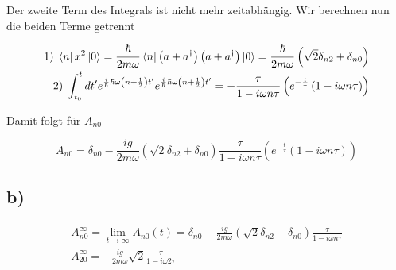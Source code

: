 Der zweite Term des Integrals ist nicht mehr zeitabh\"angig. Wir berechnen nun die beiden Terme getrennt

\begin{align}
1) \; \Bra{n} x^2 \Ket{0} = \frac{\hbar}{2m \omega} \Bra{n} \left(a + a^{\dagger} \right) \left(a + a^{\dagger} \right) \Ket{0} = \frac{\hbar}{2m \omega} \left( \sqrt{2} \delta_{n2} + \delta_{n0} \right) \\
2) \; \int_{t_0}^t dt' e^{\frac{i}{\hbar} \hbar \omega \left( n + \frac{1}{2} \right) t'} e^{\frac{i}{\hbar} \hbar \omega \left( n + \frac{1}{2} \right) t'} = -\frac{\tau}{1-i \omega n \tau} \left( e^{- \frac{t}{\tau}} \left(1-i\omega n \tau \right) \right)
\end{align}

Damit folgt f\"ur $A_{n0}$

\begin{equation}
A_{n0} = \delta_{n0} - \frac{ig}{2m \omega} \left( \sqrt{2} \delta_{n2} + \delta_{n0} \right) \frac{\tau}{1-i \omega n \tau} \left( e^{- \frac{t}{\tau}} \left(1-i\omega n \tau \right) \right)
\end{equation}

\subsection{b)}
 \begin{align}
 A_{n0}^{\infty} = \lim\limits_{t \rightarrow \infty} A_{n0} \left( t \right) = \delta_{n0} - \frac{ig}{2m \omega} \left( \sqrt{2} \delta_{n2} + \delta_{n0} \right) \frac{\tau}{1-i \omega n \tau} \\
 A_{20}^{\infty} = - \frac{ig}{2m \omega} \sqrt{2} \frac{\tau}{1-i \omega 2 \tau}
 \end{align}